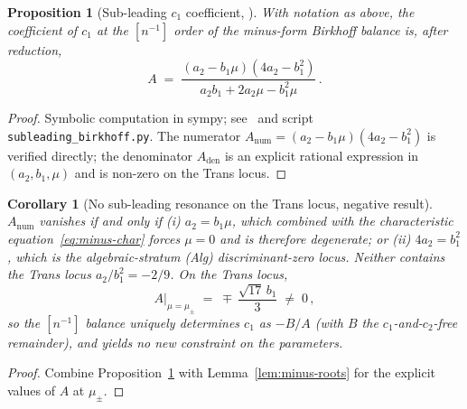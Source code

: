 \documentclass[11pt]{amsart}
\newtheorem{proposition}[theorem]{Proposition}
\newtheorem{corollary}[theorem]{Corollary}
\theoremstyle{definition}
\theoremstyle{remark}
\begin{document}
\begin{proposition}[Sub-leading $c_1$ coefficient, \cite{SprintW3Report}]
\label{prop:c1-coefficient}
With notation as above, the coefficient of $c_1$ at the $[n^{-1}]$
order of the minus-form Birkhoff balance is, after reduction,
\begin{equation}\label{eq:c1-A}
  A \;=\; \frac{(a_2 - b_1\mu)(4 a_2 - b_1^2)}%
                {a_2 b_1 + 2 a_2\mu - b_1^2\mu}\,.
\end{equation}
\end{proposition}
\begin{proof}
Symbolic computation in sympy; see~\cite[]{SprintW3Report}
and script \texttt{subleading\_birkhoff.py}.  The numerator
$A_{\text{num}} = (a_2-b_1\mu)(4 a_2 - b_1^2)$ is verified directly;
the denominator $A_{\text{den}}$ is an explicit rational
expression in $(a_2,b_1,\mu)$ and is non-zero on the Trans locus.
\end{proof}

\begin{corollary}[No sub-leading resonance on the Trans locus,
negative result]
\label{cor:no-resonance}
$A_{\text{num}}$ vanishes if and only if (i) $a_2 = b_1\mu$, which
combined with the characteristic equation~\eqref{eq:minus-char}
forces $\mu = 0$ and is therefore degenerate; or (ii)
$4 a_2 = b_1^2$, which is the algebraic-stratum (Alg)
discriminant-zero locus.  Neither contains the Trans locus
$a_2/b_1^2 = -2/9$.  On the Trans locus,
\[
  A\bigl|_{\mu = \mu_\pm}
  \;=\; \mp\,\frac{\sqrt{17}\,b_1}{3}
  \;\neq\;0\,,
\]
so the $[n^{-1}]$ balance uniquely determines $c_1$ as $-B/A$
(with $B$ the $c_1$-and-$c_2$-free remainder), and yields no new
constraint on the parameters.
\end{corollary}
\begin{proof}
Combine Proposition~\ref{prop:c1-coefficient} with
Lemma~\ref{lem:minus-roots} for the explicit values of $A$ at
$\mu_\pm$.
\end{proof}
\end{document}
